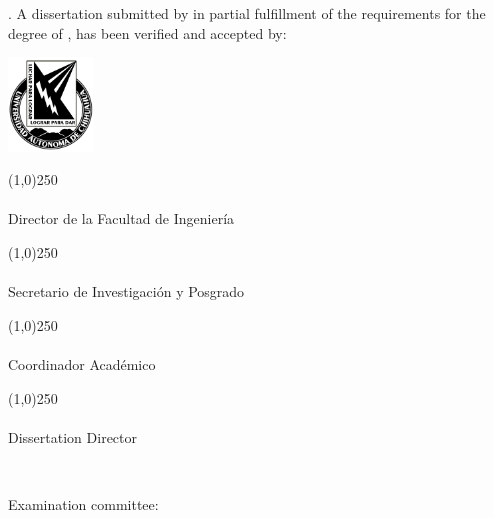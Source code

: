 
\newpage
\thispagestyle{empty}

\noindent
\justify
\vTitle. A dissertation submitted by \vAuthor in partial fulfillment of the requirements for the degree of \vDegree, has been verified and accepted by:

\vspace*{-1.9cm}
\hspace*{-3.7cm}
\includegraphics[keepaspectratio=true,height=2.5cm]{template/uach.png}
\vspace*{1cm}

\noindent\line(1,0){250} \\
\textbf{\vFDirector} \\
Director de la Facultad de Ingeniería \\

\vspace*{8mm}

\noindent\line(1,0){250} \\
\textbf{\vFSecretario} \\
Secretario de Investigación y Posgrado \\

\vspace*{6mm}

\noindent\line(1,0){250} \\
\textbf{\vFCoordinador} \\
Coordinador Académico \\

\vspace*{6mm}

\noindent\line(1,0){250} \\
\textbf{\vDissertationDirector} \\
Dissertation Director \\

\vspace*{6mm}

\noindent
\textbf{\vDate} \\

\vspace*{6mm}

\noindent
Examination committee: \\

\vCommittee

\vspace*{1.5cm}

\hspace*{5.3cm}

\restoregeometry    